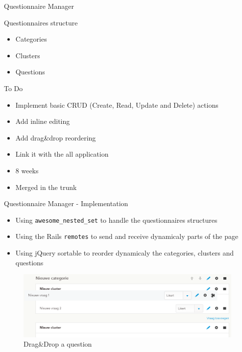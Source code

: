 \documentclass[10pt,a4paper]{beamer}
\begin{document}
\begin{frame}{Questionnaire Manager}
  \begin{block}{Questionnaires structure}
    \begin{itemize}
      \item Categories
      \item Clusters
      \item Questions 
    \end{itemize}
  \end{block}

  \begin{block}{To Do}
    \begin{itemize}
      \item Implement basic CRUD (Create, Read, Update and Delete) actions 
      \item Add inline editing
      \item Add drag\&drop reordering 
      \item Link it with the all application
    \end{itemize}
  \end{block}
  
  \begin{block}{}
    \begin{itemize}
      \item 8 weeks
      \item Merged in the trunk
    \end{itemize}
  \end{block}
\end{frame}

\begin{frame}{Questionnaire Manager - Implementation}
  \begin{itemize}
    \item Using \texttt{awesome\_nested\_set} to handle the questionnaires structures
    \item Using the Rails \texttt{remotes} to send and receive dynamicaly parts of the page
    \item Using jQuery sortable to reorder dynamicaly the categories, clusters and questions
  \end{itemize}
  
  \begin{figure}[htp]
  \centering
  \includegraphics[scale=0.3]{../img/calibris_drag_drop.png}
   \caption{Drag\&Drop a question}
  \end{figure}
\end{frame}
\end{document}
